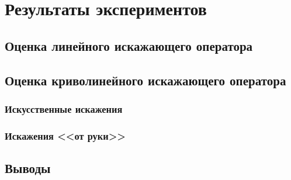 \chapter{Результаты экспериментов}
\section{Оценка линейного искажающего оператора}
\section{Оценка криволинейного искажающего оператора}
\subsection{Искусственные искажения}
\subsection{Искажения <<от руки>>}
\section{Выводы}
